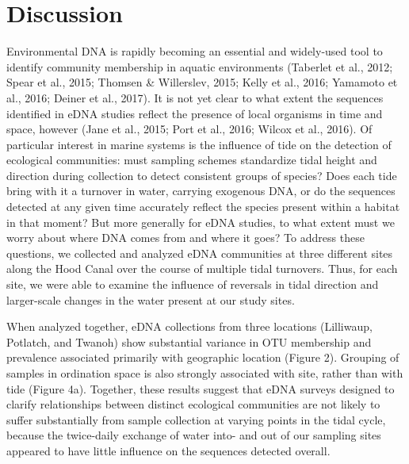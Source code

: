 \documentclass[fleqn,10pt,lineno]{wlpeerj} %
\begin{document}
\section{Discussion}\label{discussion}

Environmental DNA is rapidly becoming an essential and widely-used tool
to identify community membership in aquatic environments (Taberlet et
al., 2012; Spear et al., 2015; Thomsen \& Willerslev, 2015; Kelly et
al., 2016; Yamamoto et al., 2016; Deiner et al., 2017). It is not yet
clear to what extent the sequences identified in eDNA studies reflect
the presence of local organisms in time and space, however (Jane et al.,
2015; Port et al., 2016; Wilcox et al., 2016). Of particular interest in
marine systems is the influence of tide on the detection of ecological
communities: must sampling schemes standardize tidal height and
direction during collection to detect consistent groups of species? Does
each tide bring with it a turnover in water, carrying exogenous DNA, or
do the sequences detected at any given time accurately reflect the
species present within a habitat in that moment? But more generally for
eDNA studies, to what extent must we worry about where DNA comes from
and where it goes? To address these questions, we collected and analyzed
eDNA communities at three different sites along the Hood Canal over the
course of multiple tidal turnovers. Thus, for each site, we were able to
examine the influence of reversals in tidal direction and larger-scale
changes in the water present at our study sites.

When analyzed together, eDNA collections from three locations
(Lilliwaup, Potlatch, and Twanoh) show substantial variance in OTU
membership and prevalence associated primarily with geographic location
(Figure 2). Grouping of samples in ordination space is also strongly
associated with site, rather than with tide (Figure 4a). Together, these
results suggest that eDNA surveys designed to clarify relationships
between distinct ecological communities are not likely to suffer
substantially from sample collection at varying points in the tidal
cycle, because the twice-daily exchange of water into- and out of our
sampling sites appeared to have little influence on the sequences
detected overall.
\end{document}

